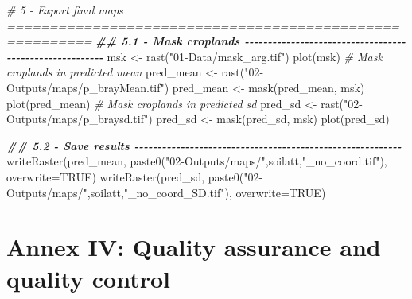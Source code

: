 \documentclass[
  10pt,
  b5paper,
  oneside]{book}
\newenvironment{Shaded}{\begin{snugshade}}{\end{snugshade}}
\newcommand{\AttributeTok}[1]{\textcolor[rgb]{0.77,0.63,0.00}{#1}}
\newcommand{\CommentTok}[1]{\textcolor[rgb]{0.56,0.35,0.01}{\textit{#1}}}
\newcommand{\ConstantTok}[1]{\textcolor[rgb]{0.00,0.00,0.00}{#1}}
\newcommand{\DocumentationTok}[1]{\textcolor[rgb]{0.56,0.35,0.01}{\textbf{\textit{#1}}}}
\newcommand{\FunctionTok}[1]{\textcolor[rgb]{0.00,0.00,0.00}{#1}}
\newcommand{\NormalTok}[1]{#1}
\newcommand{\OtherTok}[1]{\textcolor[rgb]{0.56,0.35,0.01}{#1}}
\newcommand{\StringTok}[1]{\textcolor[rgb]{0.31,0.60,0.02}{#1}}
\begin{document}
\begin{Shaded}
\begin{Highlighting}[]
\CommentTok{\# 5 {-} Export final maps ========================================================}
\DocumentationTok{\#\# 5.1 {-} Mask croplands {-}{-}{-}{-}{-}{-}{-}{-}{-}{-}{-}{-}{-}{-}{-}{-}{-}{-}{-}{-}{-}{-}{-}{-}{-}{-}{-}{-}{-}{-}{-}{-}{-}{-}{-}{-}{-}{-}{-}{-}{-}{-}{-}{-}{-}{-}{-}{-}{-}{-}{-}{-}{-}{-}{-}{-}}
\NormalTok{msk }\OtherTok{\textless{}{-}} \FunctionTok{rast}\NormalTok{(}\StringTok{"01{-}Data/mask\_arg.tif"}\NormalTok{)}
\FunctionTok{plot}\NormalTok{(msk)}
\CommentTok{\# Mask croplands in predicted mean}
\NormalTok{pred\_mean }\OtherTok{\textless{}{-}} \FunctionTok{rast}\NormalTok{(}\StringTok{"02{-}Outputs/maps/p\_brayMean.tif"}\NormalTok{)}
\NormalTok{pred\_mean }\OtherTok{\textless{}{-}} \FunctionTok{mask}\NormalTok{(pred\_mean, msk)}
\FunctionTok{plot}\NormalTok{(pred\_mean)}
\CommentTok{\# Mask croplands in predicted sd}
\NormalTok{pred\_sd }\OtherTok{\textless{}{-}} \FunctionTok{rast}\NormalTok{(}\StringTok{"02{-}Outputs/maps/p\_braysd.tif"}\NormalTok{)}
\NormalTok{pred\_sd }\OtherTok{\textless{}{-}} \FunctionTok{mask}\NormalTok{(pred\_sd, msk)}
\FunctionTok{plot}\NormalTok{(pred\_sd)}

\DocumentationTok{\#\# 5.2 {-} Save results {-}{-}{-}{-}{-}{-}{-}{-}{-}{-}{-}{-}{-}{-}{-}{-}{-}{-}{-}{-}{-}{-}{-}{-}{-}{-}{-}{-}{-}{-}{-}{-}{-}{-}{-}{-}{-}{-}{-}{-}{-}{-}{-}{-}{-}{-}{-}{-}{-}{-}{-}{-}{-}{-}{-}{-}{-}{-}}
\FunctionTok{writeRaster}\NormalTok{(pred\_mean, }
            \FunctionTok{paste0}\NormalTok{(}\StringTok{"02{-}Outputs/maps/"}\NormalTok{,soilatt,}\StringTok{"\_no\_coord.tif"}\NormalTok{),}
            \AttributeTok{overwrite=}\ConstantTok{TRUE}\NormalTok{)}
\FunctionTok{writeRaster}\NormalTok{(pred\_sd, }
            \FunctionTok{paste0}\NormalTok{(}\StringTok{"02{-}Outputs/maps/"}\NormalTok{,soilatt,}\StringTok{"\_no\_coord\_SD.tif"}\NormalTok{),}
            \AttributeTok{overwrite=}\ConstantTok{TRUE}\NormalTok{)}
\end{Highlighting}
\end{Shaded}

\hypertarget{annex-iv-quality-assurance-and-quality-control}{%
\chapter*{Annex IV: Quality assurance and quality control}\label{annex-iv-quality-assurance-and-quality-control}}
\end{document}
